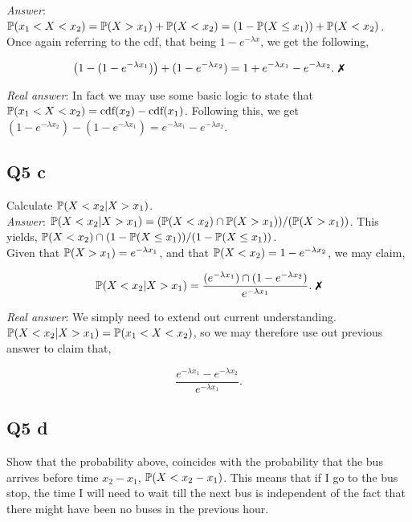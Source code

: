 \documentclass{article}
\begin{document}
            \textit{Answer}: $\mathbb{P}(x_1 < X < x_2) = \mathbb{P}(X > x_1) + \mathbb{P}(X < x_2) = (1-\mathbb{P}(X \leq x_1)) + \mathbb{P}(X < x_2)$.\\

            Once again referring to the cdf, that being $1 - e^{-\lambda x}$, we get the following,

            \[\left( 1 - (1 - e^{-\lambda x_1}) \right) + (1 - e^{-\lambda x_2}) = 1 + e^{-\lambda x_1} - e^{-\lambda x_2}.~\xmark\]

            \textit{Real answer}: In fact we may use some basic logic to state that $\mathbb{P}(x_1 < X < x_2) = \text{cdf}(x_2) - \text{cdf}(x_1)$. Following this, we get $(1 - e^{-\lambda x_2}) - (1 - e^{-\lambda x_1}) = e^{-\lambda x_1} - e^{-\lambda x_2}$.

        \subsection{Q5 c}
            Calculate $\mathbb{P}(X < x_2 | X > x_1)$.\\

            \textit{Answer}: $\mathbb{P}(X < x_2 | X > x_1) = (\mathbb{P}(X < x_2)\cap \mathbb{P}(X > x_1))/(\mathbb{P}(X > x_1))$. This yields, $\mathbb{P}(X < x_2)\cap (1 - \mathbb{P}(X \leq x_1))/(1 - \mathbb{P}(X \leq x_1))$.\\

            Given that $\mathbb{P}(X > x_1) = e^{-\lambda x_1}$, and that $\mathbb{P}(X < x_2) = 1 - e^{-\lambda x_2}$, we may claim,

            \[\po(X < x_2 | X > x_1) = \frac{(e^{-\lambda x_1})\cap(1 - e^{-\lambda x_2})}{e^{-\lambda x_1}}.~ \xmark\]

            \textit{Real answer}: We simply need to extend out current understanding. $\mathbb{P}(X < x_2 | X > x_1) = \mathbb{P}(x_1 < X < x_2)$, so we may therefore use out previous answer to claim that,

            \[\frac{e^{-\lambda x_1} - e^{-\lambda x_2}}{e^{-\lambda x_1}}.\]

        \subsection{Q5 d}
            Show that the probability above, coincides with the probability that the bus arrives before time $x_2-x_1$, $\mathbb{P}(X < x_2-x_1)$. This means that if I go to the bus stop, the time I will need to wait till the next bus is independent of the fact that there might have been no buses in the previous hour.\\
\end{document}
